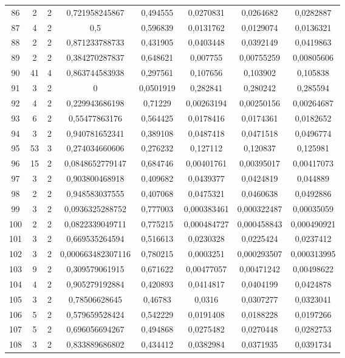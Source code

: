 \begin{longtable}{|c|c|c|c|c|c|c|c|}
86 & 2 & 2 & 0,721958245867 & 0,494555 & 0,0270831 & 0,0264682 & 0,0282887 \\
87 & 4 & 2 & 0,5 & 0,596839 & 0,0131762 & 0,0129074 & 0,0136321 \\
88 & 2 & 2 & 0,871233788733 & 0,431905 & 0,0403448 & 0,0392149 & 0,0419863 \\
89 & 2 & 2 & 0,384270287837 & 0,648621 & 0,007755 & 0,00755259 & 0,00805606 \\
90 & 41 & 4 & 0,863744583938 & 0,297561 & 0,107656 & 0,103902 & 0,105838 \\
91 & 3 & 2 & 0 & 0,0501919 & 0,282841 & 0,280242 & 0,285594 \\
92 & 4 & 2 & 0,229943686198 & 0,71229 & 0,00263194 & 0,00250156 & 0,00264687 \\
93 & 6 & 2 & 0,55477863176 & 0,564425 & 0,0178416 & 0,0174361 & 0,0182652 \\
94 & 3 & 2 & 0,940781652341 & 0,389108 & 0,0487418 & 0,0471518 & 0,0496774 \\
95 & 53 & 3 & 0,274034660606 & 0,276232 & 0,127112 & 0,120837 & 0,125981 \\
96 & 15 & 2 & 0,0848652779147 & 0,684746 & 0,00401761 & 0,00395017 & 0,00417073 \\
97 & 3 & 2 & 0,903800468918 & 0,409682 & 0,0439377 & 0,0424819 & 0,044889 \\
98 & 2 & 2 & 0,948583037555 & 0,407068 & 0,0475321 & 0,0460638 & 0,0492886 \\
99 & 3 & 2 & 0,0936325288752 & 0,777003 & 0,000383461 & 0,000322487 & 0,00035059 \\
100 & 2 & 2 & 0,0822339049711 & 0,775215 & 0,000484727 & 0,000458843 & 0,000490921 \\
101 & 3 & 2 & 0,669535264594 & 0,516613 & 0,0230328 & 0,0225424 & 0,0237412 \\
102 & 3 & 2 & 0,000663482307116 & 0,780215 & 0,0003251 & 0,000293507 & 0,000313995 \\
103 & 9 & 2 & 0,309579061915 & 0,671622 & 0,00477057 & 0,00471242 & 0,00498622 \\
104 & 4 & 2 & 0,905279192884 & 0,420893 & 0,0414817 & 0,0404199 & 0,0424878 \\
105 & 3 & 2 & 0,78506628645 & 0,46783 & 0,0316 & 0,0307277 & 0,0323041 \\
106 & 5 & 2 & 0,579659528424 & 0,542229 & 0,0191408 & 0,0188228 & 0,0197266 \\
107 & 5 & 2 & 0,696056694267 & 0,494868 & 0,0275482 & 0,0270448 & 0,0282753 \\
108 & 3 & 2 & 0,833889686802 & 0,434412 & 0,0382984 & 0,0371935 & 0,0391734 \\

\end{longtable}
